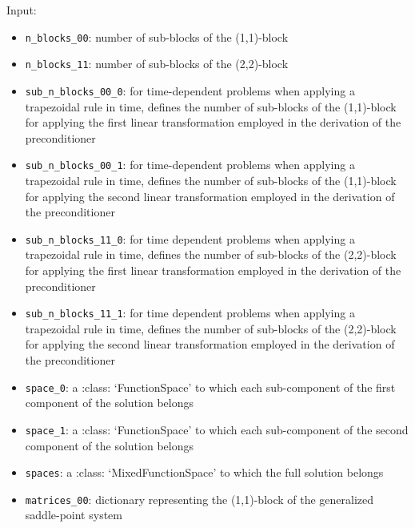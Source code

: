 \documentclass[letterpaper,10pt,english]{sphinxmanual}
\begin{document}
Input:
\begin{itemize}
\item \texttt{n{\_}blocks{\_}00}: number of sub-blocks of the (1,1)-block

\item \texttt{n{\_}blocks{\_}11}: number of sub-blocks of the (2,2)-block

\item \texttt{sub{\_}n{\_}blocks{\_}00{\_}0}: for time-dependent problems when applying
                a trapezoidal rule in time, defines the number of sub-blocks
                of the (1,1)-block for applying the first linear transformation
                employed in the derivation of the preconditioner

\item \texttt{sub{\_}n{\_}blocks{\_}00{\_}1}: for time-dependent problems when applying
                a trapezoidal rule in time, defines the number of sub-blocks
                of the (1,1)-block for applying the second linear transformation
                employed in the derivation of the preconditioner

\item \texttt{sub{\_}n{\_}blocks{\_}11{\_}0}: for time dependent problems when applying
                a trapezoidal rule in time, defines the number of sub-blocks
                of the (2,2)-block for applying the first linear transformation
                employed in the derivation of the preconditioner

\item \texttt{sub{\_}n{\_}blocks{\_}11{\_}1}: for time dependent problems when applying
                a trapezoidal rule in time, defines the number of sub-blocks
                of the (2,2)-block for applying the second linear
                transformation employed in the derivation of the preconditioner

\item \texttt{space{\_}0}: a :class: `FunctionSpace' to which each sub-component
                of the first component of the solution belongs

\item \texttt{space{\_}1}: a :class: `FunctionSpace' to which each sub-component
                of the second component of the solution belongs

\item \texttt{spaces}: a :class: `MixedFunctionSpace' to which the full
                solution belongs

\item \texttt{matrices{\_}00}: dictionary representing the (1,1)-block of the
                generalized saddle-point system


\end{itemize}
\end{document}
